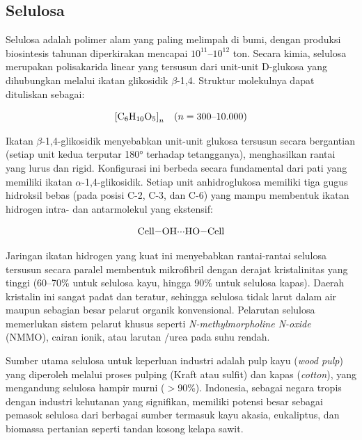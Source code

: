\documentclass[12pt,a4paper,openany]{book}
\begin{document}
\subsection{Selulosa}
\label{subsec:selulosa}

Selulosa adalah polimer alam yang paling melimpah di bumi, dengan produksi biosintesis tahunan diperkirakan mencapai $10^{11}$--$10^{12}$ ton. Secara kimia, selulosa merupakan polisakarida linear yang tersusun dari unit-unit D-glukosa yang dihubungkan melalui ikatan glikosidik $\beta$-1,4. Struktur molekulnya dapat dituliskan sebagai:

\begin{equation}
\ce{[C6H10O5]}_n \quad (n = 300\text{--}10.000)
\end{equation}

Ikatan $\beta$-1,4-glikosidik menyebabkan unit-unit glukosa tersusun secara bergantian (setiap unit kedua terputar 180° terhadap tetangganya), menghasilkan rantai yang lurus dan rigid. Konfigurasi ini berbeda secara fundamental dari pati yang memiliki ikatan $\alpha$-1,4-glikosidik. Setiap unit anhidroglukosa memiliki tiga gugus hidroksil bebas (pada posisi C-2, C-3, dan C-6) yang mampu membentuk ikatan hidrogen intra- dan antarmolekul yang ekstensif:

\begin{equation}
\ce{Cell-OH\bond{...}HO-Cell}
\end{equation}

Jaringan ikatan hidrogen yang kuat ini menyebabkan rantai-rantai selulosa tersusun secara paralel membentuk mikrofibril dengan derajat kristalinitas yang tinggi (60--70\% untuk selulosa kayu, hingga 90\% untuk selulosa kapas). Daerah kristalin ini sangat padat dan teratur, sehingga selulosa tidak larut dalam air maupun sebagian besar pelarut organik konvensional. Pelarutan selulosa memerlukan sistem pelarut khusus seperti \textit{N-methylmorpholine N-oxide} (NMMO), cairan ionik, atau larutan /urea pada suhu rendah.

Sumber utama selulosa untuk keperluan industri adalah pulp kayu (\textit{wood pulp}) yang diperoleh melalui proses pulping (Kraft atau sulfit) dan kapas (\textit{cotton}), yang mengandung selulosa hampir murni ($>$90\%). Indonesia, sebagai negara tropis dengan industri kehutanan yang signifikan, memiliki potensi besar sebagai pemasok selulosa dari berbagai sumber termasuk kayu akasia, eukaliptus, dan biomassa pertanian seperti tandan kosong kelapa sawit.
\end{document}
